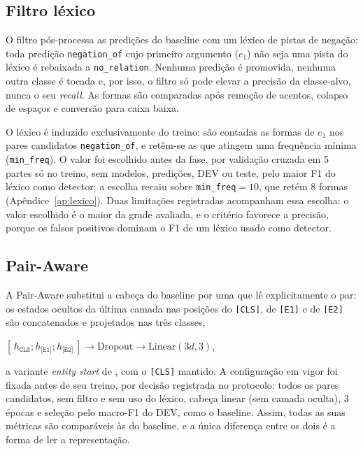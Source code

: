 \subsection{Filtro léxico}
\label{sec:filtro}

O filtro pós-processa as predições do baseline com um léxico de pistas de
negação: toda predição \texttt{negation\_of} cujo primeiro argumento ($e_1$) não seja
uma pista do léxico é rebaixada a \texttt{no\_relation}. Nenhuma predição é
promovida, nenhuma outra classe é tocada e, por isso, o filtro só pode elevar a
precisão da classe-alvo, nunca o seu \emph{recall}. As formas são comparadas após
remoção de acentos, colapso de espaços e conversão para caixa baixa.

O léxico é induzido exclusivamente do treino: são contadas as formas de
$e_1$ nos pares candidatos \texttt{negation\_of}, e retêm-se as que atingem uma
frequência mínima (\texttt{min\_freq}). O valor foi escolhido antes da fase, por
validação cruzada em 5 partes só no treino, sem modelos, predições, DEV ou teste,
pelo maior F1 do léxico como detector; a escolha recaiu sobre
\texttt{min\_freq}$=10$, que retém 8 formas (Apêndice~\ref{ap:lexico}). Duas
limitações registradas acompanham essa escolha: o valor escolhido é o maior da grade
avaliada, e o critério favorece a precisão, porque os falsos positivos dominam o F1
de um léxico usado como detector.

\subsection{Pair-Aware}
\label{sec:pairaware}

A Pair-Aware substitui a cabeça do baseline por uma que lê explicitamente o par: os
estados ocultos da última camada nas posições do \texttt{[CLS]}, de \texttt{[E1]} e
de \texttt{[E2]} são concatenados e projetados nas três classes,
%
\begin{center}
$[\,h_{\texttt{CLS}} ; h_{\texttt{[E1]}} ; h_{\texttt{[E2]}}\,] \rightarrow
\mathrm{Dropout} \rightarrow \mathrm{Linear}(3d, 3)$,
\end{center}
%
a variante \emph{entity start} de , com o
\texttt{[CLS]} mantido. A configuração em vigor foi fixada antes de seu treino, por
decisão registrada no protocolo: todos os pares candidatos, sem filtro e sem uso do
léxico, cabeça linear (sem camada oculta), 3 épocas e seleção pelo macro-F1 do DEV,
como o baseline. Assim, todas as suas métricas são comparáveis às do baseline, e a
única diferença entre os dois é a forma de ler a representação.

